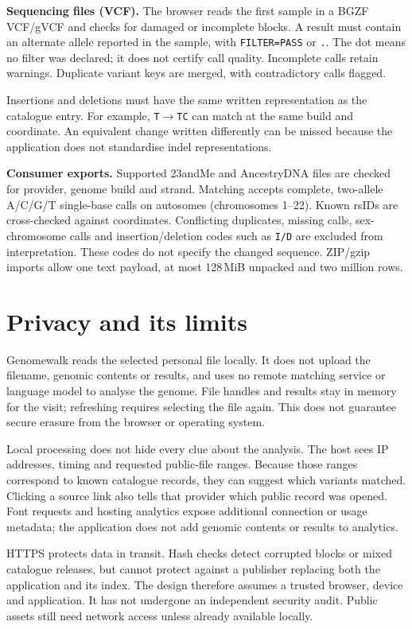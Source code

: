 \documentclass[10pt,twocolumn,letterpaper]{article}
\newcommand{\code}[1]{\texttt{\small #1}}
\begin{document}
\textbf{Sequencing files (VCF).} The browser reads the first sample in a BGZF VCF/gVCF and checks for damaged or incomplete blocks. A result must contain an alternate allele reported in the sample, with \code{FILTER=PASS} or \code{.}. The dot means no filter was declared; it does not certify call quality. Incomplete calls retain warnings. Duplicate variant keys are merged, with contradictory calls flagged.

Insertions and deletions must have the same written representation as the catalogue entry. For example, \code{T}$\rightarrow$\code{TC} can match at the same build and coordinate. An equivalent change written differently can be missed because the application does not standardise indel representations.

\textbf{Consumer exports.} Supported 23andMe and AncestryDNA files are checked for provider, genome build and strand. Matching accepts complete, two-allele A/C/G/T single-base calls on autosomes (chromosomes 1--22). Known rsIDs are cross-checked against coordinates. Conflicting duplicates, missing calls, sex-chromosome calls and insertion/deletion codes such as \code{I/D} are excluded from interpretation. These codes do not specify the changed sequence. ZIP/gzip imports allow one text payload, at most 128\,MiB unpacked and two million rows.

\section{Privacy and its limits}
Genomewalk reads the selected personal file locally. It does not upload the filename, genomic contents or results, and uses no remote matching service or language model to analyse the genome. File handles and results stay in memory for the visit; refreshing requires selecting the file again. This does not guarantee secure erasure from the browser or operating system.

Local processing does not hide every clue about the analysis. The host sees IP addresses, timing and requested public-file ranges. Because those ranges correspond to known catalogue records, they can suggest which variants matched. Clicking a source link also tells that provider which public record was opened. Font requests and hosting analytics expose additional connection or usage metadata; the application does not add genomic contents or results to analytics.

HTTPS protects data in transit. Hash checks detect corrupted blocks or mixed catalogue releases, but cannot protect against a publisher replacing both the application and its index. The design therefore assumes a trusted browser, device and application. It has not undergone an independent security audit. Public assets still need network access unless already available locally.
\end{document}
